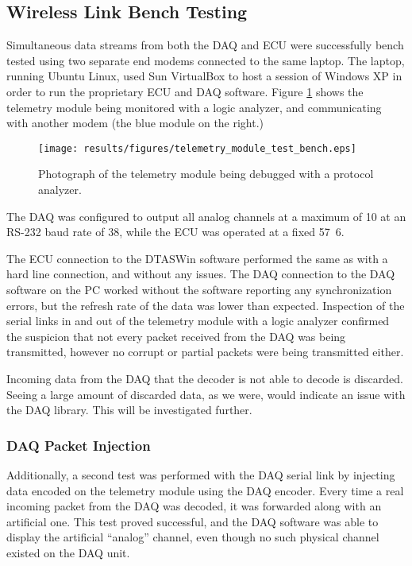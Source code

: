 \subsection{Wireless Link Bench Testing}

Simultaneous data streams from both the DAQ and ECU were successfully bench tested using two separate end modems connected to the same laptop. The laptop, running Ubuntu Linux, used Sun VirtualBox to host a session of Windows XP in order to run the proprietary ECU and DAQ software. Figure \ref{fig:telemetry_bench_test} shows the telemetry module being monitored with a logic analyzer, and communicating with another modem (the blue module on the right.)

\begin{figure}[H]
 \centering
 \texttt{[image: results/figures/telemetry\_module\_test\_bench.eps]}
 \caption{Photograph of the telemetry module being debugged with a protocol analyzer.}
 \label{fig:telemetry_bench_test}
\end{figure}

The DAQ was configured to output all analog channels at a maximum of \unit{10}{\hertz} at an RS-232 baud rate of \unit{38}{\kilo\bit\per\second}, while the ECU was operated at a fixed \unit{57.6}{\kilo\bit\per\second}.

The ECU connection to the DTASWin software performed the same as with a hard line connection, and without any issues. The DAQ connection to the DAQ software on the PC worked without the software reporting any synchronization errors, but the refresh rate of the data was lower than expected. Inspection of the serial links in and out of the telemetry module with a logic analyzer confirmed the suspicion that not every packet received from the DAQ was being transmitted, however no corrupt or partial packets were being transmitted either.

Incoming data from the DAQ that the decoder is not able to decode is discarded. Seeing a large amount of discarded data, as we were, would indicate an issue with the DAQ library. This will be investigated further.

\subsubsection{DAQ Packet Injection}

Additionally, a second test was performed with the DAQ serial link by injecting data encoded on the telemetry module using the DAQ encoder. Every time a real incoming packet from the DAQ was decoded, it was forwarded along with an artificial one. This test proved successful, and the DAQ software was able to display the artificial ``analog'' channel, even though no such physical channel existed on the DAQ unit.
